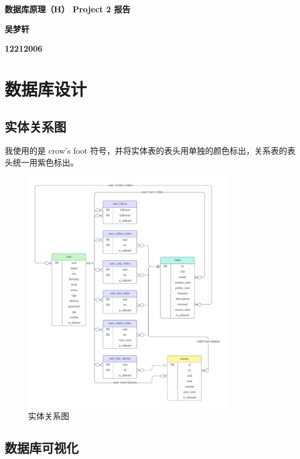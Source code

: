 \documentclass[a4paper,10pt]{ctexart}
\begin{document}
\begin{center}
	{\Large \bf 数据库原理（H） Project 2 报告}
	\vspace{2mm}

	{\bf 吴梦轩}
    \vspace{2mm}

	{\bf 12212006}
		
\end{center}  

\vspace{0.4cm}

\section{数据库设计}

\subsection{实体关系图}

我使用的是 crow's foot 符号，并将实体表的表头用单独的颜色标出，关系表的表头统一用紫色标出。

\begin{figure}[H]
    \centering
    \includegraphics[width=0.8\textwidth]{Database ER diagram (crow's foot).png}
    \caption{实体关系图}
\end{figure}

\newpage
\subsection{数据库可视化}
\end{document}
